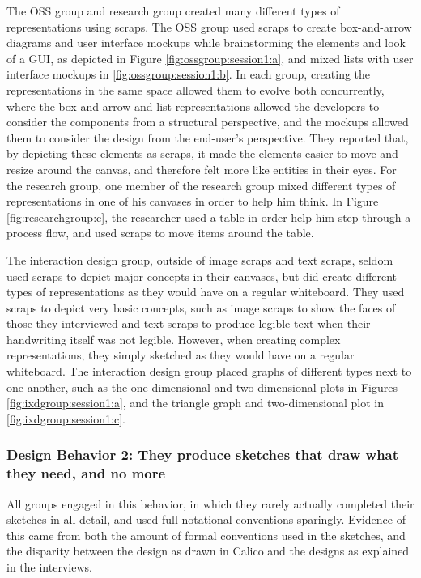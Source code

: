 \documentclass[12pt,fleqn]{ucithesis}
\begin{document}
The OSS group and research group created many different types of representations using scraps. The OSS group used scraps to create box-and-arrow diagrams and user interface mockups while brainstorming the elements and look of a GUI, as depicted in Figure \ref{fig:ossgroup:session1:a}, and mixed lists with user interface mockups in \ref{fig:ossgroup:session1:b}. In each group, creating the representations in the same space allowed them to evolve both concurrently, where the box-and-arrow and list representations allowed the developers to consider the components from a structural perspective, and the mockups allowed them to consider the design from the end-user's perspective. They reported that, by depicting these elements as scraps, it made the elements easier to move and resize around the canvas, and therefore felt more like entities in their eyes. For the research group, one member of the research group mixed different types of representations in one of his canvases in order to help him think. In Figure \ref{fig:researchgroup:c}, the researcher used a table in order help him step through a process flow, and used scraps to move items around the table.

The interaction design group, outside of image scraps and text scraps, seldom used scraps to depict major concepts in their canvases, but did create different types of representations as they would have on a regular whiteboard. They used scraps to depict very basic concepts, such as image scraps to show the faces of those they interviewed and text scraps to produce legible text when their handwriting itself was not legible. However, when creating complex representations, they simply sketched as they would have on a regular whiteboard. The interaction design group placed graphs of different types next to one another, such as the one-dimensional and two-dimensional plots in Figures \ref{fig:ixdgroup:session1:a}, and the triangle graph and two-dimensional plot in \ref{fig:ixdgroup:session1:c}. 


\subsubsection{Design Behavior 2: They produce sketches that draw what they need, and no more}

All groups engaged in this behavior, in which they rarely actually completed their sketches in all detail, and used full notational conventions sparingly. Evidence of this came from both the amount of formal conventions used in the sketches, and the disparity between the design as drawn in Calico and the designs as explained in the interviews.
\end{document}
